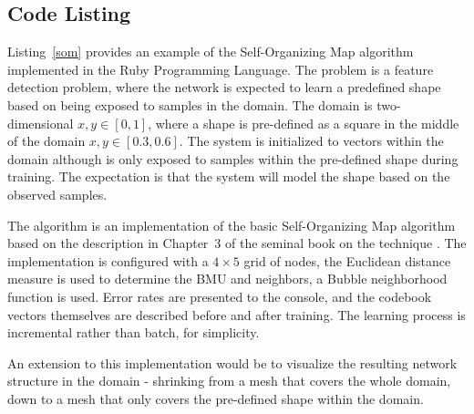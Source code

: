 \subsection{Code Listing}
Listing~\ref{som} provides an example of the Self-Organizing Map algorithm implemented in the Ruby Programming Language. 
The problem is a feature detection problem, where the network is expected to learn a predefined shape based on being exposed to samples in the domain. The domain is two-dimensional $x,y \in [0,1]$, where a shape is pre-defined as a square in the middle of the domain $x,y \in [0.3,0.6]$. The system is initialized to vectors within the domain although is only exposed to samples within the pre-defined shape during training. The expectation is that the system will model the shape based on the observed samples.

The algorithm is an implementation of the basic Self-Organizing Map algorithm based on the description in Chapter~3 of the seminal book on the technique \cite{Kohonen1995}. The implementation is configured with a $4 \times 5$ grid of nodes, the Euclidean distance measure is used to determine the BMU and neighbors, a Bubble neighborhood function is used. Error rates are presented to the console, and the codebook vectors themselves are described before and after training. The learning process is incremental rather than batch, for simplicity. 

An extension to this implementation would be to visualize the resulting network structure in the domain - shrinking from a mesh that covers the whole domain, down to a mesh that only covers the pre-defined shape within the domain.



